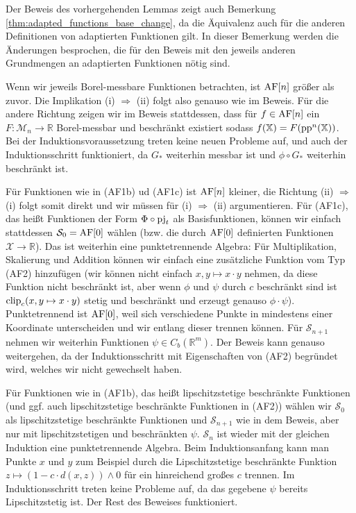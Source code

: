     \begin{remark}\label{rem:adapted_base_exchange}
        Der Beweis des vorhergehenden Lemmas zeigt auch Bemerkung \ref{thm:adapted_functions_base_change}, da die Äquivalenz auch für die anderen Definitionen von adaptierten Funktionen gilt. In dieser Bemerkung werden die Änderungen besprochen, die für den Beweis mit den jeweils anderen Grundmengen an adaptierten Funktionen nötig sind.
        
        Wenn wir jeweils Borel-messbare Funktionen betrachten, ist $\operatorname{AF}[n]$ größer als zuvor. Die Implikation (i) $\Rightarrow$ (ii) folgt also genauso wie im Beweis. Für die andere Richtung zeigen wir im Beweis stattdessen, dass für $f \in \operatorname{AF}[n]$ ein $F: \mathcal{M}_n \rightarrow \mathbb{R}$ Borel-messbar und beschränkt existiert sodass $f(\mathbb{X})=F(\operatorname{pp}^n(\mathbb{X}))$. Bei der Induktionsvoraussetzung treten keine neuen Probleme auf, und auch der Induktionsschritt funktioniert, da $G_*$ weiterhin messbar ist und $\phi \circ G_*$ weiterhin beschränkt ist.

        Für Funktionen wie in (AF1b) ud (AF1c) ist $\operatorname{AF}[n]$ kleiner, die Richtung (ii) $\Rightarrow$ (i) folgt somit direkt und wir müssen für (i) $\Rightarrow$ (ii) argumentieren. Für (AF1c), das heißt Funktionen der Form $\Phi \circ \operatorname{pj}_t$ als Basisfunktionen, können wir einfach stattdessen $\mathcal{S}_0 = \operatorname{AF}[0]$ wählen (bzw. die durch $\operatorname{AF}[0]$ definierten Funktionen $\mathcal{X} \rightarrow \mathbb{R}$). Das ist weiterhin eine punktetrennende Algebra: Für Multiplikation, Skalierung und Addition können wir einfach eine zusätzliche Funktion vom Typ (AF2) hinzufügen (wir können nicht einfach $x,y\mapsto x\cdot y$ nehmen, da diese Funktion nicht beschränkt ist, aber wenn $\phi$ und $\psi$ durch $c$ beschränkt sind ist $\operatorname{clip}_c(x,y\mapsto x\cdot y)$ stetig und beschränkt und erzeugt genauso $\phi \cdot \psi$). 
        Punktetrennend ist $\operatorname{AF}[0]$, weil sich verschiedene Punkte in mindestens einer Koordinate unterscheiden und wir entlang dieser trennen können. Für $\mathcal{S}_{n+1}$ nehmen wir weiterhin Funktionen $\psi \in C_b(\mathbb{R}^m)$. Der Beweis kann genauso weitergehen, da der Induktionsschritt mit Eigenschaften von (AF2) begründet wird, welches wir nicht gewechselt haben.

        Für Funktionen wie in (AF1b), das heißt lipschitzstetige beschränkte Funktionen (und ggf. auch lipschitzstetige beschränkte Funktionen in (AF2)) wählen wir $\mathcal{S}_0$ als lipschitzstetige beschränkte Funktionen und $\mathcal{S}_{n+1}$ wie in dem Beweis, aber nur mit lipschitzstetigen und beschränkten $\psi$. $\mathcal{S}_n$ ist wieder mit der gleichen Induktion eine punktetrennende Algebra. Beim Induktionsanfang kann man Punkte $x$ und $y$ zum Beispiel durch die Lipschitzstetige beschränkte Funktion $z \mapsto (1 - c\cdot d(x,z)) \wedge 0$ für ein hinreichend großes $c$ trennen. Im Induktionsschritt treten keine Probleme auf, da das gegebene $\psi$ bereits Lipschitzstetig ist. Der Rest des Beweises funktioniert. 

    \end{remark}

